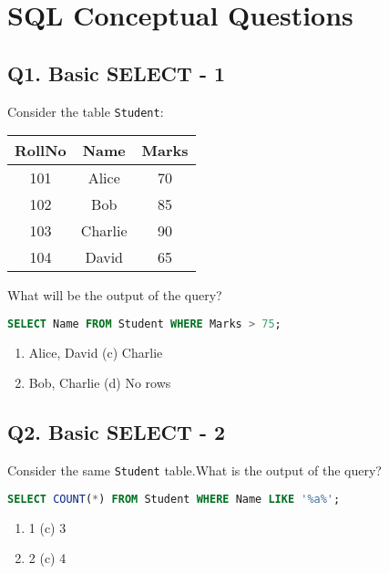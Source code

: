 \section{SQL Conceptual Questions}

\subsection*{Q1. Basic SELECT - 1}
Consider the table \texttt{Student}:

\vspace{0.4cm}
\begin{tabular}{|c|c|c|}
\hline
\textbf{RollNo} & \textbf{Name} & \textbf{Marks} \\
\hline
101 & Alice & 70 \\
102 & Bob & 85 \\
103 & Charlie & 90 \\
104 & David & 65 \\
\hline
\end{tabular}

\vspace{0.4cm}
What will be the output of the query?

\begin{lstlisting}[language=SQL]
SELECT Name FROM Student WHERE Marks > 75;
\end{lstlisting}

\begin{enumerate}[label=(\alph*)]
    \item Alice, David \hspace{5cm} (c) Charlie
    \item Bob, Charlie \hspace{5cm} (d) No rows
\end{enumerate}

\subsection*{Q2. Basic SELECT - 2}
Consider the same \texttt{Student} table.\newline What is the output of the query?

\begin{lstlisting}[language=SQL]
SELECT COUNT(*) FROM Student WHERE Name LIKE '%a%';
\end{lstlisting}

\begin{enumerate}[label=(\alph*)]
    \item 1 \hspace{5cm} (c) 3
    \item 2 \hspace{5cm} (c) 4
\end{enumerate}

